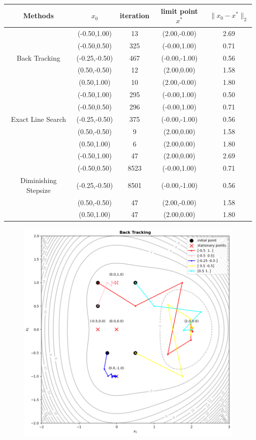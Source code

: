 \documentclass{article}
\begin{document}
\begin{center}
    \begin{tabular}{|c|cccc|} 
        \hline
        Methods & $x_0$ & iteration & limit point $x^*$ & $\|x_0-x^*\|_2$ \\
        \hline
        &(-0.50,1.00) & 13 & (2.00,-0.00) & 2.69 \\ %
        &(-0.50,0.50) & 325 & (-0.00,1.00) & 0.71 \\ %
        Back Tracking&(-0.25,-0.50) & 467 & (-0.00,-1.00) & 0.56 \\ %
        &(0.50,-0.50) & 12 & (2.00,0.00) & 1.58 \\ %
        &(0.50,1.00) & 10 & (2.00,-0.00) & 1.80 \\ %
        \hline
        \hline
        &(-0.50,1.00) & 295 & (-0.00,1.00) & 0.50 \\ %
        &(-0.50,0.50) & 296 & (-0.00,1.00) & 0.71 \\ %
        Exact Line Search&(-0.25,-0.50) & 375 & (-0.00,-1.00) & 0.56 \\ %
        &(0.50,-0.50) & 9 & (2.00,0.00) & 1.58 \\ %
        &(0.50,1.00) & 6 & (2.00,0.00) & 1.80 \\ %
        \hline
        \hline
        &(-0.50,1.00) & 47 & (2.00,0.00) & 2.69 \\ %
        &(-0.50,0.50) & 8523 & (-0.00,1.00) & 0.71 \\ %
        Diminishing Stepsize&(-0.25,-0.50) & 8501 & (-0.00,-1.00) & 0.56 \\ %
        &(0.50,-0.50) & 47 & (2.00,-0.00) & 1.58 \\ %
        &(0.50,1.00) & 47 & (2.00,0.00) & 1.80 \\ %
      \hline
    \end{tabular} 
\end{center}

\begin{figure}[h]
    \centering
    \includegraphics[scale = 0.8]{Back Tracking.png}
\end{figure}
\end{document}
